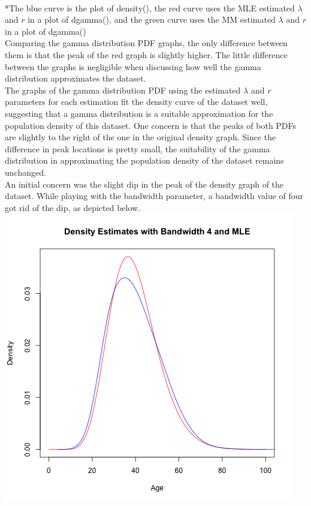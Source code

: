 \documentclass[12pt, letterpaper]{article}
\begin{document}
\footnotesize
\\ \**The blue curve is the plot of density(), the red curve uses the MLE estimated {$\lambda$} and $r$ in a plot of dgamma(), and the green curve uses the MM estimated {$\lambda$} and $r$ in a plot of dgamma() \\
\normalsize
Comparing the gamma distribution PDF graphs, the only difference between them is that the peak of the red graph is slightly higher. The little difference between the graphs is negligible when discussing how well the gamma distribution approximates the dataset. \\
The graphs of the gamma distribution PDF using the estimated $\lambda$ and $r$ parameters for each estimation fit the density curve of the dataset well, suggesting that a gamma distribution is a suitable approximation for the population density of this dataset. One concern is that the peaks of both PDFs are slightly to the right of the one in the original density graph. Since the difference in peak locations is pretty small, the suitability of the gamma distribution in approximating the population density of the dataset remains unchanged.
\\[0.5\baselineskip]
An initial concern was the slight dip in the peak of the density graph of the dataset. While playing with the bandwidth parameter, a bandwidth value of four got rid of the dip, as depicted below.
\\
\includegraphics[scale=0.9]{prgeng_age_bandwidth_4}
\end{document}
